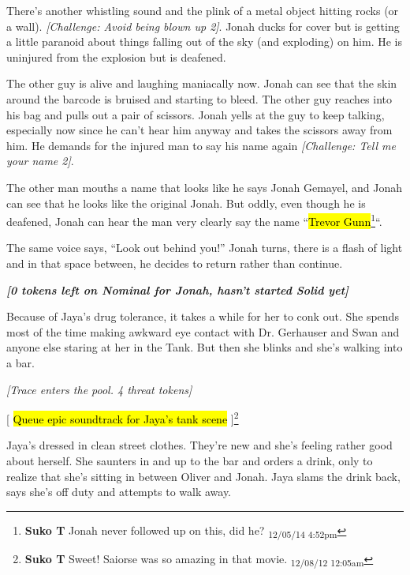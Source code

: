 There's another whistling sound and the plink of a metal object hitting rocks (or a wall).  \textit{{[}Challenge: Avoid being blown up 2{]}}.  Jonah ducks for cover but is getting a little paranoid about things falling out of the sky (and exploding) on him.  He is uninjured from the explosion but is deafened. 



The other guy is alive and laughing maniacally now.  Jonah can see that the skin around the barcode is bruised and starting to bleed.  The other guy reaches into his bag and pulls out a pair of scissors.  Jonah yells at the guy to keep talking, especially now since he can't hear him anyway and takes the scissors away from him.  He demands for the injured man to say his name again  \textit{{[}Challenge: Tell me your name 2{]}}.



The other man mouths a name that looks like he says Jonah Gemayel, and Jonah can see that he looks like the original Jonah.  But oddly, even though he is deafened, Jonah can hear the man very clearly say the name ``\hl{Trevor Gunn}\footnote{\textbf{Suko T }Jonah never followed up on this, did he? \textsubscript{12/05/14 4:52pm}}``.



The same voice says, ``Look out behind you!''  Jonah turns, there is a flash of light and in that space between, he decides to return rather than continue.



\textit{\textbf{{[}0 tokens left on Nominal for Jonah, hasn't started Solid yet{]}}}



Because of Jaya's drug tolerance, it takes a while for her to conk out.  She spends most of the time making awkward eye contact with Dr. Gerhauser and Swan and anyone else staring at her in the Tank.  But then she blinks and she's walking into a bar.



\textit{{[}Trace enters the pool.  4 threat tokens{]}}

{[}{\color[RGB]{17,85,204} \hl{Queue epic soundtrack for Jaya's tank scene} }{]}\footnote{\textbf{Suko T }Sweet!  Saiorse was so amazing in that movie. \textsubscript{12/08/12 12:05am}}



Jaya's dressed in clean street clothes.  They're new and she's feeling rather good about herself.  She saunters in and up to the bar and orders a drink, only to realize that she's sitting in between Oliver and Jonah.  Jaya slams the drink back, says she's off duty and attempts to walk away.




